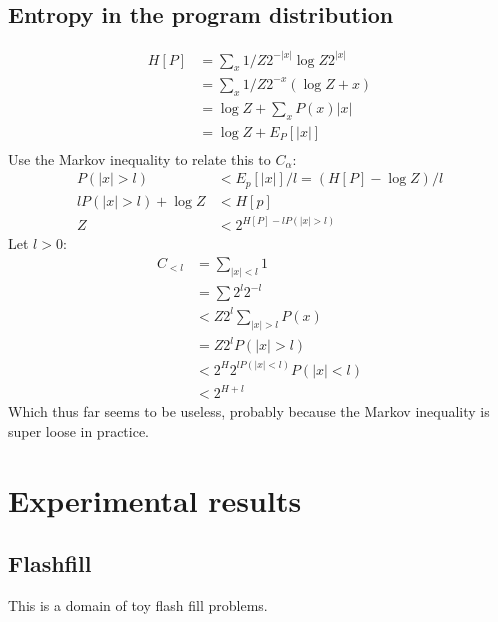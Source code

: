 \documentclass{article}
\begin{document}
\subsection{Entropy in the program distribution}
\begin{align}
  H[P] &=  \sum_x 1/Z2^{-|x|} \log Z2^{|x|}\\
  & = \sum_x 1/Z 2^{-x} (\log Z + x)\\
  & = \log Z + \sum_x P(x)|x|\\
  & = \log Z + E_P[|x|]\\
\end{align}
Use the Markov inequality to relate this to $C_\alpha$:
\begin{align}
  P(|x| > l) & < E_p[|x|]/l = (H[P] - \log Z)/l %
  \\  lP(|x| > l) + \log Z& < H[p]\\
  Z& < 2^{H[P] - lP(|x| > l)}
\end{align}
Let $l > 0$:
\begin{align}
  C_{  <  l}& = \sum_{|x| < l}1\\
  & = \sum 2^l2^{-l}\\
  &   < Z  2^l\sum_{|x| > l}P(x)\\
  & = Z2^lP(|x| > l)\\
  & < 2^H2^{lP(|x|<l)}P(|x|<l)\\
  & < 2^{H+l}
\end{align}
Which thus far seems to be useless, probably because the Markov inequality is super loose in practice.


\section{Experimental results}

\subsection{Flashfill}
This is a domain of toy flash fill problems.
\end{document}
